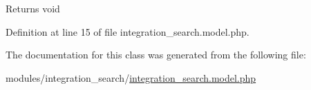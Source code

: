 \begin{DoxyReturn}{Returns}
void 
\end{DoxyReturn}


Definition at line 15 of file integration\-\_\-search.\-model.\-php.



The documentation for this class was generated from the following file\-:\begin{DoxyCompactItemize}
\item 
modules/integration\-\_\-search/\hyperlink{integration__search_8model_8php}{integration\-\_\-search.\-model.\-php}\end{DoxyCompactItemize}
